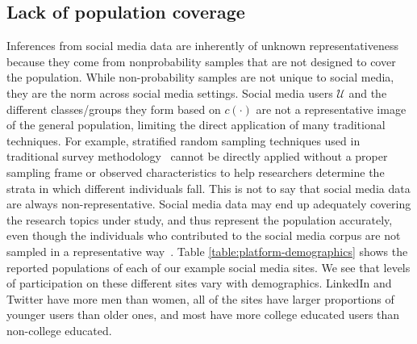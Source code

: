 \documentclass[11pt]{article} %
\begin{document}
\subsection{Lack of population coverage}

Inferences from social media data are inherently of unknown representativeness because they come from nonprobability samples that are not designed to cover the population. While non-probability samples are not unique to social media, they are the norm across social media settings. Social media users $\mathcal{U}$ and the different classes/groups they form based on $c(\cdot)$ are not a representative image of the general population, limiting the direct application of many traditional techniques. For example, stratified random sampling techniques used in traditional survey methodology~\cite{deleeuw2008} cannot be directly applied without a proper sampling frame or observed characteristics to help researchers determine the strata in which different individuals fall. This is not to say that social media data are always non-representative. Social media data may end up adequately covering the research topics under study, and thus represent the population accurately, even though the individuals who contributed to the social media corpus are not sampled in a representative way~\cite{schober2016}.
Table \ref{table:platform-demographics} shows the reported populations of each of our example social media sites.  We see that levels of participation on these different sites vary with demographics. LinkedIn and Twitter have more men than women, all of the sites have larger proportions of younger users than older ones, and most have more college educated users than non-college educated.  
\end{document}
